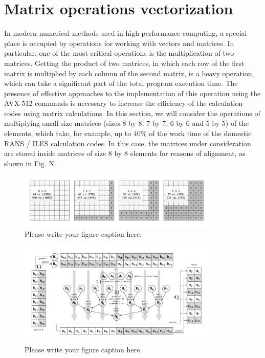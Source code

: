 \documentclass[
11pt,%
tightenlines,%
twoside,%
onecolumn,%
nofloats,%
nobibnotes,%
nofootinbib,%
superscriptaddress,%
noshowpacs,%
centertags]%
{revtex4}
\begin{document}
\section{Matrix operations vectorization}

In modern numerical methods used in high-performance computing, a special place is occupied by operations for working with vectors and matrices. In particular, one of the most critical operations is the multiplication of two matrices. Getting the product of two matrices, in which each row of the first matrix is multiplied by each column of the second matrix, is a heavy operation, which can take a significant part of the total program execution time. The presence of effective approaches to the implementation of this operation using the AVX-512 commands is necessary to increase the efficiency of the calculation codes using matrix calculations. In this section, we will consider the operations of multiplying small-size matrices (sizes 8 by 8, 7 by 7, 6 by 6 and 5 by 5) of the elements, which take, for example, up to 40\% of the work time of the domestic RANS / ILES calculation codes. In this case, the matrices under consideration are stored inside matrices of size 8 by 8 elements for reasons of alignment, as shown in Fig. N.

\begin{figure}[h]
\setcaptionmargin{5mm}
\onelinecaptionstrue  %
\includegraphics[width=0.85\textwidth]{pics/matrices_8x8_7x7_6x6_5x5.pdf}
\caption{Please write your figure caption here.}\label{fig:1}
\end{figure}

\begin{figure}[h]
\setcaptionmargin{5mm}
\onelinecaptionstrue  %
\includegraphics[width=0.85\textwidth]{pics/mmult_1.pdf}
\caption{Please write your figure caption here.}\label{fig:1}
\end{figure}
\end{document}
